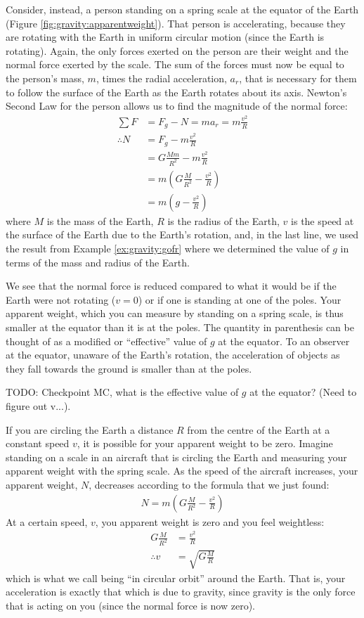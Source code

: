 Consider, instead, a person standing on a spring scale at the equator of the Earth (Figure \ref{fig:gravity:apparentweight}). That person is accelerating, because they are rotating with the Earth in uniform circular motion (since the Earth is rotating). Again, the only forces exerted on the person are their weight and the normal force exerted by the scale. The sum of the forces must now be equal to the person's mass, $m$, times the radial acceleration, $a_r$, that is necessary for them to follow the surface of the Earth as the Earth rotates about its axis. Newton's Second Law for the person allows us to find the magnitude of the normal force:
\begin{align*}
\sum F &= F_g-N=ma_r=m\frac{v^2}{R}\\
\therefore N &= F_g - m\frac{v^2}{R}\\
&=G\frac{Mm}{R^2} -  m\frac{v^2}{R}\\
&=m\left(G\frac{M}{R^2} - \frac{v^2}{R}  \right)\\
&=m\left(g - \frac{v^2}{R}  \right)
\end{align*}
where $M$ is the mass of the Earth, $R$ is the radius of the Earth, $v$ is the speed at the surface of the Earth due to the Earth's rotation, and, in the last line, we used the result from Example \ref{ex:gravity:gofr} where we determined the value of $g$ in terms of the mass and radius of the Earth.

We see that the normal force is reduced compared to what it would be if the Earth were not rotating ($v=0$) or if one is standing at one of the poles. Your apparent weight, which you can measure by standing on a spring scale, is thus smaller at the equator than it is at the poles. The quantity in parenthesis can be thought of as a modified or ``effective'' value of $g$ at the equator. To an observer at the equator, unaware of the Earth's rotation, the acceleration of objects as they fall towards the ground is smaller than at the poles. 

TODO: Checkpoint MC, what is the effective value of $g$ at the equator? (Need to figure out v...). 

If you are circling the Earth a distance $R$ from the centre of the Earth at a constant speed $v$, it is possible for your apparent weight to be zero. Imagine standing on a scale in an aircraft that is circling the Earth and measuring your apparent weight with the spring scale. As the speed of the aircraft increases, your apparent weight, $N$, decreases according to the formula that we just found:
\begin{align*}
N=m\left(G\frac{M}{R^2} - \frac{v^2}{R}  \right)
\end{align*}
At a certain speed, $v$, you apparent weight is zero and you feel weightless:
\begin{align*}
G\frac{M}{R^2} &= \frac{v^2}{R}\\
\therefore v&= \sqrt{G\frac{M}{R} }
\end{align*}
which is what we call being ``in circular orbit'' around the Earth. That is, your acceleration is exactly that which is due to gravity, since gravity is the only force that is acting on you (since the normal force is now zero).

